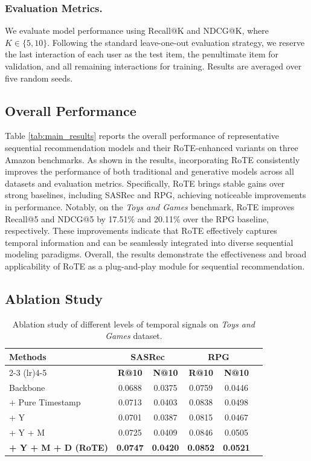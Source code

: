 \documentclass[sigconf,natbib=true]{acmart}
\begin{document}
\subsubsection{Evaluation Metrics.}

We evaluate model performance using Recall@K and NDCG@K, where $K \in \{5, 10\}$. 
Following the standard leave-one-out evaluation strategy, we reserve the last interaction of each user as the test item, the penultimate item for validation, and all remaining interactions for training. Results are averaged over five random seeds.

\subsection{Overall Performance}


Table \ref{tab:main_results} reports the overall performance of representative sequential recommendation models and their RoTE-enhanced variants on three Amazon benchmarks.
As shown in the results, incorporating RoTE consistently improves the performance of both traditional and generative models across all datasets and evaluation metrics.
Specifically, RoTE brings stable gains over strong baselines, including SASRec and RPG, achieving noticeable improvements in performance. Notably, on the \textit{Toys and Games} benchmark, RoTE improves Recall@5 and NDCG@5 by 17.51\% and 20.11\% over the RPG baseline, respectively.
These improvements indicate that RoTE effectively captures temporal information and can be seamlessly integrated into diverse sequential modeling paradigms.
Overall, the results demonstrate the effectiveness and broad applicability of RoTE as a plug-and-play module for sequential recommendation.

\subsection{Ablation Study}

\begin{table}[t]
\centering
\caption{Ablation study of different levels of temporal signals on \textit{Toys and Games} dataset.}
\label{tab:ablation}
\begin{tabular}{lccccc}
\toprule
\multirow{2}{*}{\textbf{Methods}} 
& \multicolumn{2}{c}{\textbf{SASRec}} 
& \multicolumn{2}{c}{\textbf{RPG}} \\
\cmidrule(lr){2-3} \cmidrule(lr){4-5}
& \textbf{R@10} & \textbf{N@10} 
& \textbf{R@10} & \textbf{N@10} \\
\midrule
Backbone      & 0.0688 & 0.0375 & 0.0759 & 0.0446 \\
+ Pure Timestamp          & 0.0713 & 0.0403 & 0.0838 & 0.0498 \\
+ Y                       & 0.0701 & 0.0387 & 0.0815 & 0.0467 \\
+ Y + M                     & 0.0725 & 0.0409 & 0.0846 & 0.0505 \\
\textbf{+ Y + M + D (RoTE)}      & \textbf{0.0747} & \textbf{0.0420} & \textbf{0.0852} & \textbf{0.0521} \\
\bottomrule
\end{tabular}
\end{table}
\end{document}
